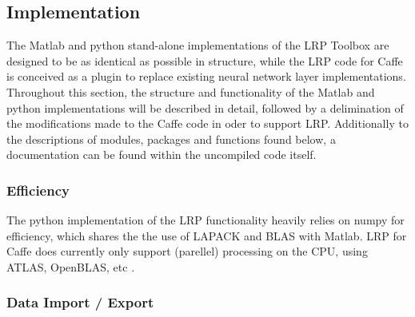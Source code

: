 \documentclass[a4wide]{article}
\begin{document}
\subsection*{Implementation}

The Matlab and python stand-alone implementations of the LRP Toolbox are designed to be as identical as possible in structure, while the LRP code for Caffe is conceived as a plugin to replace existing neural network layer implementations. Throughout this section, the structure and functionality of the Matlab and python implementations will be described in detail, followed by a delimination of the modifications made to the Caffe code in oder to support LRP. Additionally to the descriptions of modules, packages and functions found below, a documentation can be found within the uncompiled code itself.

\subsubsection*{Efficiency}

The python implementation of the LRP functionality heavily relies on numpy for efficiency, which shares the the use of LAPACK and BLAS with Matlab. LRP for Caffe does currently only support (parellel) processing on the CPU, using ATLAS, OpenBLAS, etc .

\subsubsection*{Data Import / Export}
\end{document}
